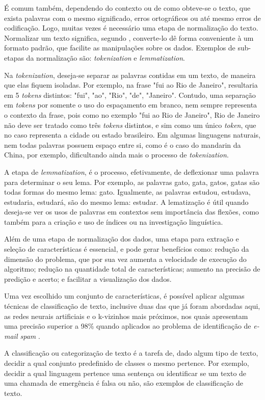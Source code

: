 É comum também, dependendo do contexto ou de como obteve-se o texto, que exista palavras com o mesmo significado, erros ortográficos ou até mesmo erros de codificação. Logo, muitas vezes é necessário uma etapa de normalização do texto. Normalizar um texto significa, segundo \citep{martin2009speech}, converte-lo dê forma conveniente à um formato padrão, que facilite as manipulações sobre os dados. Exemplos de sub-etapas da normalização são: \textit{tokenization} e \textit{lemmatization}. 

Na \textit{tokenization}, deseja-se separar as palavras contidas em um texto, de maneira que elas fiquem isoladas. Por exemplo, na frase "fui ao Rio de Janeiro", resultaria em 5 \textit{tokens} distintos: "fui", "ao", "Rio", "de", "Janeiro". Contudo, uma separação em \textit{tokens} por somente o uso do espaçamento em branco, nem sempre representa o contexto da frase, pois como no exemplo "fui ao Rio de Janeiro", Rio de Janeiro não deve ser tratado como três \textit{tokens} distintos, e sim como um único \textit{token}, que no caso representa a cidade ou estado brasileiro. Em algumas linguagens naturais, nem todas palavras possuem espaço entre si, como é o caso do mandarin da China, por exemplo, dificultando ainda mais o processo de \textit{tokenization}. 

A etapa de \textit{lemmatization}, é o processo, efetivamente, de deflexionar uma palavra para determinar o seu lema. Por exemplo, as palavras gato, gata, gatos, gatas são todas formas do mesmo lema: gato. Igualmente, as palavras estudou, estudava, estudaria, estudará, são do mesmo lema: estudar. A lematização é útil quando deseja-se ver os usos de palavras em contextos sem importância das flexões, como também para a criação e uso de índices ou na investigação linguística.

Além de uma etapa de normalização dos dados, uma etapa para extração e seleção de características é essencial, e pode gerar benefícios como: redução da dimensão do problema, que por sua vez aumenta a velocidade de execução do algoritmo; redução na quantidade total de características; aumento na precisão de predição e acerto; e facilitar a visualização dos dados.

Uma vez escolhido um conjunto de características, é possível aplicar algumas técnicas de classificação de texto, inclusive duas das que já foram abordadas aqui, as redes neurais artificiais e o k-vizinhos mais próximos, nos quais apresentam uma precisão superior a 98\% quando aplicados ao problema de identificação de \textit{e-mail spam} \citep{russell1994inteligencia}.

A classificação ou categorização de texto é a tarefa de, dado algum tipo de texto, decidir a qual conjunto predefinido de classes o mesmo pertence. Por exemplo, decidir a qual linguagem pertence uma sentença ou identificar se um texto de uma chamada de emergência é falsa ou não, são exemplos de classificação de texto.